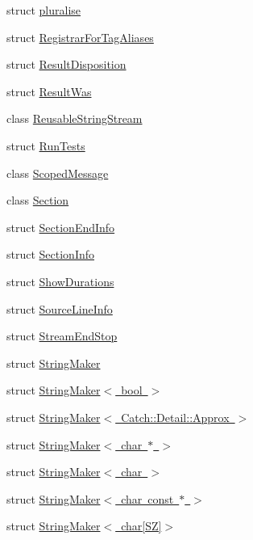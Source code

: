 \begin{DoxyCompactItemize}
\item 
struct \mbox{\hyperlink{struct_catch_1_1pluralise}{pluralise}}
\item 
struct \mbox{\hyperlink{struct_catch_1_1_registrar_for_tag_aliases}{Registrar\+For\+Tag\+Aliases}}
\item 
struct \mbox{\hyperlink{struct_catch_1_1_result_disposition}{Result\+Disposition}}
\item 
struct \mbox{\hyperlink{struct_catch_1_1_result_was}{Result\+Was}}
\item 
class \mbox{\hyperlink{class_catch_1_1_reusable_string_stream}{Reusable\+String\+Stream}}
\item 
struct \mbox{\hyperlink{struct_catch_1_1_run_tests}{Run\+Tests}}
\item 
class \mbox{\hyperlink{class_catch_1_1_scoped_message}{Scoped\+Message}}
\item 
class \mbox{\hyperlink{class_catch_1_1_section}{Section}}
\item 
struct \mbox{\hyperlink{struct_catch_1_1_section_end_info}{Section\+End\+Info}}
\item 
struct \mbox{\hyperlink{struct_catch_1_1_section_info}{Section\+Info}}
\item 
struct \mbox{\hyperlink{struct_catch_1_1_show_durations}{Show\+Durations}}
\item 
struct \mbox{\hyperlink{struct_catch_1_1_source_line_info}{Source\+Line\+Info}}
\item 
struct \mbox{\hyperlink{struct_catch_1_1_stream_end_stop}{Stream\+End\+Stop}}
\item 
struct \mbox{\hyperlink{struct_catch_1_1_string_maker}{String\+Maker}}
\item 
struct \mbox{\hyperlink{struct_catch_1_1_string_maker_3_01bool_01_4}{String\+Maker$<$ bool $>$}}
\item 
struct \mbox{\hyperlink{struct_catch_1_1_string_maker_3_01_catch_1_1_detail_1_1_approx_01_4}{String\+Maker$<$ Catch\+::\+Detail\+::\+Approx $>$}}
\item 
struct \mbox{\hyperlink{struct_catch_1_1_string_maker_3_01char_01_5_01_4}{String\+Maker$<$ char $\ast$ $>$}}
\item 
struct \mbox{\hyperlink{struct_catch_1_1_string_maker_3_01char_01_4}{String\+Maker$<$ char $>$}}
\item 
struct \mbox{\hyperlink{struct_catch_1_1_string_maker_3_01char_01const_01_5_01_4}{String\+Maker$<$ char const $\ast$ $>$}}
\item 
struct \mbox{\hyperlink{struct_catch_1_1_string_maker_3_01char[_s_z]_4}{String\+Maker$<$ char\mbox{[}\+S\+Z\mbox{]}$>$}}

\end{DoxyCompactItemize}
